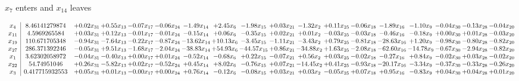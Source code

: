 \documentclass[9pt]{article}
\begin{document}
 $ x_{7} $ enters and $ x_{14} $ leaves 

 \[\begin{array}{c| c c@{\hskip 2pt} c@{\hskip 2pt} c@{\hskip 2pt} c@{\hskip 2pt} c@{\hskip 2pt} c@{\hskip 2pt} c@{\hskip 2pt} c@{\hskip 2pt} c@{\hskip 2pt} c@{\hskip 2pt} c@{\hskip 2pt} c@{\hskip 2pt} c@{\hskip 2pt} c@{\hskip 2pt} c@{\hskip 2pt} c@{\hskip 2pt} }
 x_{4}   &  8.46141279874 & +  0.02 x_{31} & +  0.55 x_{13} & -0.07 x_{17} & -0.06 x_{24} & -1.49 x_{14} & +  2.45 x_{6} & -1.98 x_{15} & +  0.03 x_{21} & -1.32 x_{2} & +  0.11 x_{25} & -0.06 x_{18} & -1.89 x_{16} & -1.10 x_{9} & -0.04 x_{30} & -0.13 x_{28} & -0.04 x_{20}\\
 x_{11}   &  4.5969265584 & +  0.03 x_{31} & +  0.12 x_{13} & -0.01 x_{17} & -0.01 x_{24} & -0.15 x_{14} & +  0.06 x_{6} & -0.35 x_{15} & +  0.02 x_{21} & +  0.01 x_{2} & -0.03 x_{25} & -0.03 x_{18} & -0.46 x_{16} & -0.18 x_{9} & +  0.00 x_{30} & +  0.01 x_{28} & -0.03 x_{20}\\
 x_{19}   &  110.671705348 & -0.94 x_{31} & -7.64 x_{13} & -0.22 x_{17} & -0.87 x_{24} & -13.62 x_{14} & + 10.13 x_{6} & -3.45 x_{15} & -1.11 x_{21} & -3.43 x_{2} & +  0.79 x_{25} & -0.81 x_{18} & -28.63 x_{16} & +  1.20 x_{9} & -0.98 x_{30} & -0.80 x_{28} & -0.82 x_{20}\\
 x_{27}   &  286.371392246 & -0.05 x_{31} & +  9.51 x_{13} & -1.68 x_{17} & -2.04 x_{24} & -38.83 x_{14} & + 54.93 x_{6} & -44.57 x_{15} & +  0.86 x_{21} & -34.88 x_{2} & +  1.63 x_{25} & -2.08 x_{18} & -62.60 x_{16} & -14.78 x_{9} & -0.67 x_{30} & -2.94 x_{28} & -0.82 x_{20}\\
 x_{1}   &  3.62302058972 & -0.04 x_{31} & -0.40 x_{13} & +  0.00 x_{17} & +  0.01 x_{24} & -0.52 x_{14} & -0.68 x_{6} & +  0.22 x_{15} & -0.07 x_{21} & +  0.56 x_{2} & +  0.03 x_{25} & -0.02 x_{18} & -0.27 x_{16} & +  0.84 x_{9} & -0.02 x_{30} & +  0.03 x_{28} & -0.02 x_{20}\\
 x_{22}   &  54.74951046 & +  0.26 x_{31} & -5.82 x_{13} & +  0.02 x_{17} & -0.52 x_{24} & +  0.45 x_{14} & +  8.02 x_{6} & -0.76 x_{15} & +  0.07 x_{21} & -14.45 x_{2} & +  0.41 x_{25} & -0.93 x_{18} & -20.17 x_{16} & -3.34 x_{9} & -0.37 x_{30} & -0.33 x_{28} & -0.26 x_{20}\\
 x_{3}   &  0.417715932553 & +  0.05 x_{31} & +  0.01 x_{13} & -0.00 x_{17} & +  0.00 x_{24} & +  0.76 x_{14} & -0.12 x_{6} & -0.08 x_{15} & +  0.03 x_{21} & +  0.03 x_{2} & -0.05 x_{25} & +  0.07 x_{18} & +  0.95 x_{16} & -0.83 x_{9} & +  0.04 x_{30} & +  0.04 x_{28} & +  0.01 x_{20}\\

\end{array}\]
\end{document}

